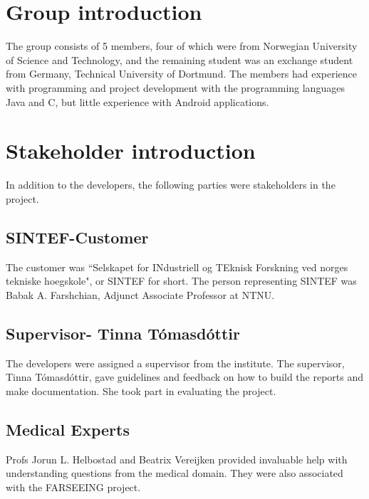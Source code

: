 \section{Group introduction}
The group consists of 5 members, four of which were from Norwegian University of Science and Technology, and the remaining student was an exchange student from Germany, Technical University of Dortmund. The members had experience with programming and project development with the programming languages Java and C$  $, but little experience with Android applications. 

\section{Stakeholder introduction}
In addition to the developers, the following parties were stakeholders in the project.
\subsection{SINTEF-Customer}
The customer was ``Selskapet for INdustriell og TEknisk Forskning ved norges tekniske hoegskole", or SINTEF for short. The person representing SINTEF was Babak A. Farshchian, Adjunct Associate Professor at NTNU.
\subsection{Supervisor- Tinna T\'{o}masd\'{o}ttir}
The developers were assigned a supervisor from the institute. The supervisor, Tinna T\'{o}masd\'{o}ttir, gave guidelines and feedback on how to build the reports and make documentation. She took part in evaluating the project. 
\subsection{Medical Experts}
Profs Jorun L. Helbostad and Beatrix Vereijken provided invaluable help with understanding questions from the medical domain. They were also associated with the FARSEEING project. 